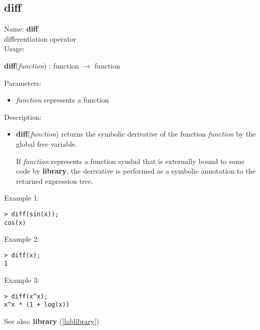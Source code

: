 \subsection{diff}
\label{labdiff}
\noindent Name: \textbf{diff}\\
differentiation operator\\
\noindent Usage: 
\begin{center}
\textbf{diff}(\emph{function}) : \textsf{function} $\rightarrow$ \textsf{function}\\
\end{center}
Parameters: 
\begin{itemize}
\item \emph{function} represents a function
\end{itemize}
\noindent Description: \begin{itemize}

\item \textbf{diff}(\emph{function}) returns the symbolic derivative of the function
   \emph{function} by the global free variable.
    
   If \emph{function} represents a function symbol that is externally bound
   to some code by \textbf{library}, the derivative is performed as a symbolic
   annotation to the returned expression tree.
\end{itemize}
\noindent Example 1: 
\begin{center}\begin{minipage}{15cm}\begin{Verbatim}[frame=single]
> diff(sin(x));
cos(x)
\end{Verbatim}
\end{minipage}\end{center}
\noindent Example 2: 
\begin{center}\begin{minipage}{15cm}\begin{Verbatim}[frame=single]
> diff(x);
1
\end{Verbatim}
\end{minipage}\end{center}
\noindent Example 3: 
\begin{center}\begin{minipage}{15cm}\begin{Verbatim}[frame=single]
> diff(x^x);
x^x * (1 + log(x))
\end{Verbatim}
\end{minipage}\end{center}
See also: \textbf{library} (\ref{lablibrary})
